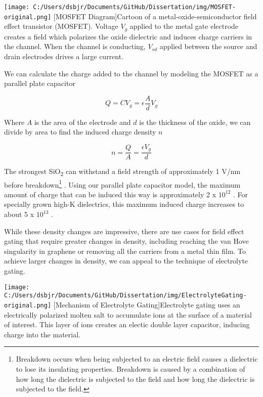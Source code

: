 \begin{centering}
\texttt{[image: C:/Users/dsbjr/Documents/GitHub/Dissertation/img/MOSFET-original.png]}
  \captionsetup{width=0.75\textwidth}
  [MOSFET Diagram]{Cartoon of a metal-oxide-semiconductor field effect transistor (MOSFET). Voltage $V_{g}$ applied to the metal gate electrode creates a field which polarizes the oxide dielectric and induces charge carriers in the channel. When the channel is conducting, $V_{sd}$ applied between the source and drain electrodes drives a large current.} 
  \label{fig:ElecGate-1}
\end{centering}

We can calculate the charge added to the channel by modeling the MOSFET as a parallel plate capacitor

\begin{equation}
Q = CV_{g} = \epsilon \frac{A}{d} V_{g}
\end{equation}

Where $A$ is the area of the electrode and $d$ is the thickness of the oxide, we can divide by area to find the induced charge density $n$

\begin{equation}
n = \frac{Q}{A} = \frac{\epsilon V_{g}}{d}
\end{equation}

The strongest SiO\textsubscript{2} can withstand a field strength of approximately 1 V/nm before breakdown\footnote{Breakdown occurs when being subjected to an electric field causes a dielectric to lose its insulating properties. Breakdown is caused by a combination of how long the dielectric is subjected to the field and how long the dielectric is subjected to the field.} \cite{Palumbo2019}. Using our parallel plate capacitor model, the maximum amount of charge that can be induced this way is approximately 2 x $10^{12}$ \percmsq . For specially grown high-K dielectrics, this maximum induced charge increases to about 5 x $10^{13}$ \percmsq \cite{Robertson2004}.

While these density changes are impressive, there are use cases for field effect gating that require greater changes in density, including reaching the van Hove singularity in graphene or removing all the carriers from a metal thin film. To achieve larger changes in density, we can appeal to the technique of electrolyte gating.

\begin{centering}
\texttt{[image: C:/Users/dsbjr/Documents/GitHub/Dissertation/img/ElectrolyteGating-original.png]}
  \captionsetup{width=0.75\textwidth}
  [Mechanism of Electrolyte Gating]{Electrolyte gating uses an electrically polarized molten salt to accumulate ions at the surface of a material of interest. This layer of ions creates an electic double layer capacitor, inducing charge into the material.} 
  \label{fig:ElecGate-2}
\end{centering}

